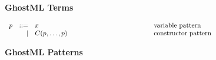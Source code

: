 \documentclass[a4paper,11pt,oneside]{article}
\begin{document}
\begin{small}
\begin{figure}[!h]
\caption*{ \textbf{GhostML Terms} \hfill}
\end{figure}
\label{GhostML  patterns}
\begin{figure}[!h]
\begin{displaymath}
  \begin{array}{rrl@{\hspace*{4.5cm}}l}
    p & ::= & x 			&								\text{variable pattern} \hspace*{5cm} \\
      &   | & C(p,\dots,p)	 &						\text{constructor pattern} \\
  \end{array} 
\end{displaymath} \vspace*{-0.5cm}
\caption*{ \textbf{GhostML Patterns} \hfill}
\end{figure}
\end{small}




\end{document}
